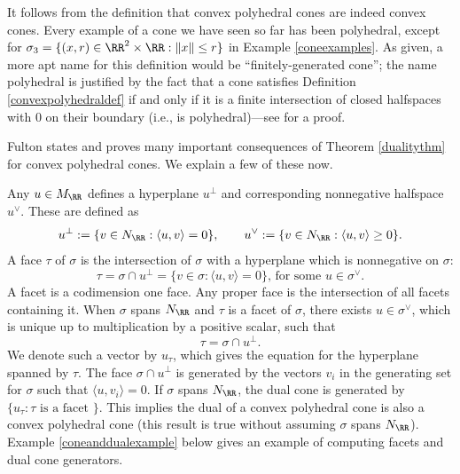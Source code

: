 \documentclass[12pt]{amsart}
\theoremstyle{plain}
\begin{document}
It follows from the definition that convex polyhedral cones are indeed convex cones.
Every example of a cone we have seen so far has been polyhedral, except for $\sigma_3 = \{(x, r) \in \RR^2 \times \RR : \|x\| \le r\}$ in Example \ref{coneexamples}.
As given, a more apt name for this definition would be ``finitely-generated cone'';
the name polyhedral is justified by the fact that a cone satisfies Definition \ref{convexpolyhedraldef} if and only if it is a finite intersection of closed halfspaces with $0$ on their boundary (i.e., is polyhedral)---see \cite[\S 1.3]{DLHK13} for a proof.

Fulton \cite[\S 1.2]{Fulton93} states and proves many important consequences of Theorem \ref{dualitythm} for convex polyhedral cones.
We explain a few of these now.

Any $u \in M_\RR$ defines a hyperplane $u^\perp$ and corresponding nonnegative halfspace $u^\vee$.
These are defined as
$$u^\perp := \{v \in N_\RR : \langle u, v\rangle = 0\}, \qquad u^\vee := \{v \in N_\RR : \langle u, v\rangle \ge 0\}.$$
A face $\tau$ of $\sigma$ is the intersection of $\sigma$ with a hyperplane which is nonnegative on $\sigma$:
$$\tau = \sigma \cap u^\perp = \{v \in \sigma : \langle u, v \rangle = 0\}, \, \text{for some } u \in \sigma^\vee.$$
A facet is a codimension one face. 
Any proper face is the intersection of all facets containing it.
When $\sigma$ spans $N_\RR$ and $\tau$ is a facet of $\sigma$, there exists $u \in \sigma^\vee$, which is unique up to multiplication by a positive scalar, such that
$$\tau = \sigma \cap u^\perp.$$
We denote such a vector by $u_\tau$, which gives the equation for the hyperplane spanned by $\tau$.
The face $\sigma \cap u^\perp$ is generated by the vectors $v_i$ in the generating set for $\sigma$ such that $\langle u, v_i\rangle = 0$.
If $\sigma$ spans $N_\RR$, the dual cone is generated by $\{u_\tau : \tau \text{ is a facet }\}$.
This implies the dual of a convex polyhedral cone is also a convex polyhedral cone (this result is true without assuming $\sigma$ spans $N_\RR$).
Example \ref{coneanddualexample} below gives an example of computing facets and dual cone generators.
\end{document}
